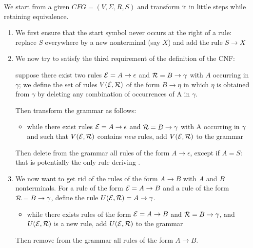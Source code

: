 \begin{code}\label{algocnf}
We start from a given $CFG = (V,\Sigma,R,S)$ and transform it in little steps while retaining equivalence.

\begin{enumerate}
\item We first ensure that the start symbol never occurs at the right of a rule: replace $S$ everywhere by a new nonterminal
  (say $X$) and add the rule $S \rightarrow X$

\item We now try to satisfy the third requirement of the
  definition of the CNF:

suppose there exist two rules ${\cal E} = A \rightarrow \epsilon$ and
${\cal R} = B \rightarrow \gamma$ with $A$ occurring in $\gamma$; we
define the set of rules $V({\cal E},{\cal R})$ of the form
$B \rightarrow \eta$ in which $\eta$ is obtained from $\gamma$ by deleting any combination of occurrences of A in $\gamma$.

Then transform the grammar as follows:

\begin{itemize}
\item[]
while there exist rules ${\cal E} = A \rightarrow \epsilon$ and
${\cal R} = B \rightarrow \gamma$ with A occurring in $\gamma$ and
such that $V({\cal E},{\cal R})$ contains {\em new} rules, add
$V({\cal E},{\cal R})$ to the grammar
\end{itemize}

Then delete from the grammar all rules of the form $A \rightarrow
\epsilon$, except if $A = S$: that is potentially the only rule
deriving \eps.

\item We now want to get rid of the rules of the form
$A \rightarrow B$ with $A$ and $B$ nonterminals. For a rule of the form
${\cal E} = A \rightarrow B$ and a rule of the form ${\cal R} = B
  \rightarrow \gamma$, define the rule $U({\cal E},{\cal R}) = A
  \rightarrow \gamma$.

\begin{itemize}
\item[] while there exists rules of the form ${\cal E} = A \rightarrow B$
and ${\cal R} = B \rightarrow \gamma$, and $U({\cal E},{\cal R})$ is a
new rule, add $U({\cal E},{\cal R})$ to the grammar
\end{itemize}

Then remove from the grammar all rules of the form $A \rightarrow B$.


\end{enumerate}
\end{code}

